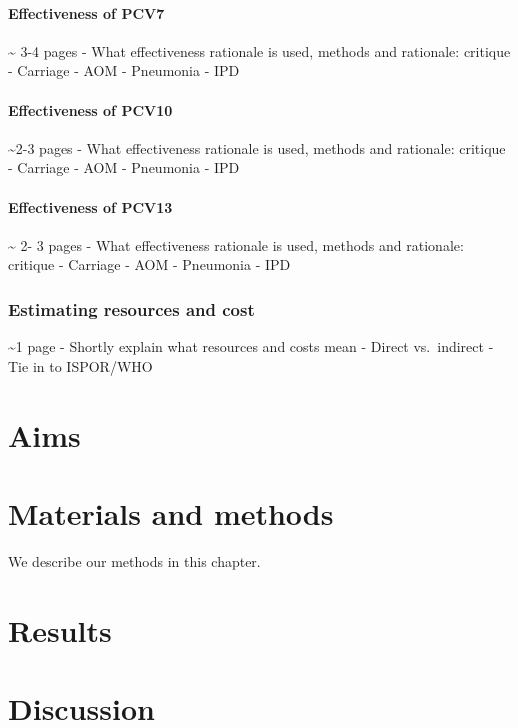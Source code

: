 \documentclass[]{book}
\theoremstyle{definition}
\theoremstyle{definition}
\theoremstyle{definition}
\theoremstyle{remark}
\begin{document}
\subsubsection{Effectiveness of PCV7}\label{effectiveness-of-pcv7}

\textasciitilde{} 3-4 pages - What effectiveness rationale is used,
methods and rationale: critique - Carriage - AOM - Pneumonia - IPD

\subsubsection{Effectiveness of PCV10}\label{effectiveness-of-pcv10}

\textasciitilde{}2-3 pages - What effectiveness rationale is used,
methods and rationale: critique - Carriage - AOM - Pneumonia - IPD

\subsubsection{Effectiveness of PCV13}\label{effectiveness-of-pcv13}

\textasciitilde{} 2- 3 pages - What effectiveness rationale is used,
methods and rationale: critique - Carriage - AOM - Pneumonia - IPD

\subsection{Estimating resources and
cost}\label{estimating-resources-and-cost}

\textasciitilde{}1 page - Shortly explain what resources and costs mean
- Direct vs.~indirect - Tie in to ISPOR/WHO

\chapter{Aims}\label{aims}

\chapter{Materials and methods}\label{methods}

We describe our methods in this chapter.

\chapter{Results}\label{results}

\chapter{Discussion}\label{discussion}


\end{document}
